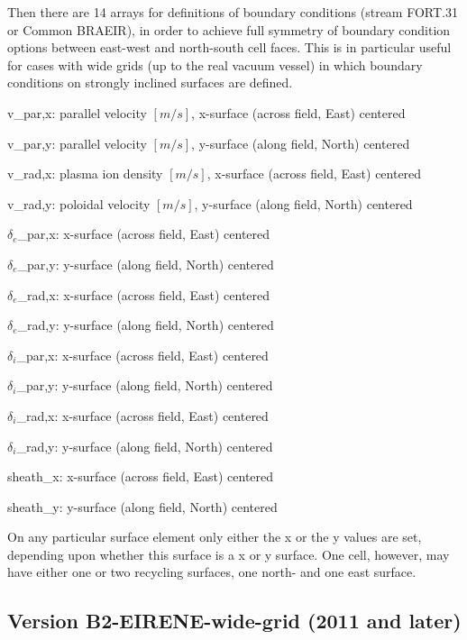 Then there are 14 arrays for definitions of boundary conditions (stream FORT.31 or Common BRAEIR), in order to
achieve full symmetry of boundary condition options between east-west and north-south cell faces. This is in particular useful for cases with wide grids
(up to the real vacuum vessel)
in which boundary conditions on strongly inclined surfaces are defined.
\begin{list}{ }{}
\item[{ 1 }] v\_par,x: parallel velocity $[m/s]$, x-surface (across field, East)  centered
\item[{ 2 }] v\_par,y: parallel velocity $[m/s]$, y-surface (along field, North) centered
\item[{ 3 }] v\_rad,x: plasma ion density $[m/s]$, x-surface (across field, East)  centered
\item[{ 4 }] v\_rad,y: poloidal velocity $[m/s]$, y-surface (along field, North) centered
\item[{ 5 }] $\delta_e$\_par,x:   x-surface (across field, East)  centered
\item[{ 6 }] $\delta_e$\_par,y:   y-surface (along field, North) centered
\item[{ 7 }] $\delta_e$\_rad,x:   x-surface (across field, East)  centered
\item[{ 8 }] $\delta_e$\_rad,y:   y-surface (along field, North) centered
\item[{ 9 }] $\delta_i$\_par,x:   x-surface (across field, East)  centered
\item[{10 }] $\delta_i$\_par,y:   y-surface (along field, North) centered
\item[{11 }] $\delta_i$\_rad,x:   x-surface (across field, East)  centered
\item[{12 }] $\delta_i$\_rad,y:   y-surface (along field, North) centered
\item[{13 }] sheath\_x:   x-surface (across field, East)  centered
\item[{14 }] sheath\_y:   y-surface (along field, North) centered
\end{list}
On any particular surface element only either the x or the y values are set, depending upon whether this
surface is a x or y surface. One cell, however, may have either one or two recycling surfaces,
one north- and one east surface.

\subsection{Version B2-EIRENE-wide-grid (2011 and later)} \label{sec2.14.3}
\medskip

